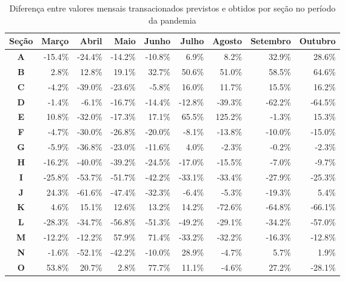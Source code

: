 \begin{table}[htb]
\centering
\caption{Diferença entre valores mensais transacionados previstos e obtidos por seção no período da pandemia}
\label{tab:pandemia:variacao-mensal-por-secao}
    \begin{tabular}{c|r|r|r|r|r|r|r|r}
        \toprule
        \textbf{Seção} & Março & Abril & Maio & Junho & Julho & Agosto & Setembro & Outubro \\
        \midrule
        \textbf{A} & -15.4\% & -24.4\% & -14.2\% & -10.8\% &   6.9\% &   8.2\% &  32.9\% &  28.6\% \\
        \textbf{B} &   2.8\% &  12.8\% &  19.1\% &  32.7\% &  50.6\% &  51.0\% &  58.5\% &  64.6\% \\
        \textbf{C} &  -4.2\% & -39.0\% & -23.6\% &  -5.8\% &  16.0\% &  11.7\% &  15.5\% &  16.2\% \\
        \textbf{D} &  -1.4\% &  -6.1\% & -16.7\% & -14.4\% & -12.8\% & -39.3\% & -62.2\% & -64.5\% \\
        \textbf{E} &  10.8\% & -32.0\% & -17.3\% &  17.1\% &  65.5\% & 125.2\% &  -1.3\% &  15.3\% \\
        \textbf{F} &  -4.7\% & -30.0\% & -26.8\% & -20.0\% &  -8.1\% & -13.8\% & -10.0\% & -15.0\% \\
        \textbf{G} &  -5.9\% & -36.8\% & -23.0\% & -11.6\% &   4.0\% &  -2.3\% &  -0.2\% &  -2.3\% \\
        \textbf{H} & -16.2\% & -40.0\% & -39.2\% & -24.5\% & -17.0\% & -15.5\% &  -7.0\% &  -9.7\% \\
        \textbf{I} & -25.8\% & -53.7\% & -51.7\% & -42.2\% & -33.1\% & -33.4\% & -27.9\% & -25.3\% \\
        \textbf{J} &  24.3\% & -61.6\% & -47.4\% & -32.3\% &  -6.4\% &  -5.3\% & -19.3\% &   5.4\% \\
        \textbf{K} &   4.6\% &  15.1\% &  12.6\% &  13.2\% &  14.2\% & -72.6\% & -64.8\% & -66.1\% \\
        \textbf{L} & -28.3\% & -34.7\% & -56.8\% & -51.3\% & -49.2\% & -29.1\% & -34.2\% & -57.0\% \\
        \textbf{M} & -12.2\% & -12.2\% &  57.9\% &  71.4\% & -33.2\% & -32.2\% & -16.3\% & -12.8\% \\
        \textbf{N} &  -1.6\% & -52.1\% & -42.2\% & -10.0\% &  28.9\% &  -4.7\% &   5.7\% &   1.9\% \\
        \textbf{O} &  53.8\% &  20.7\% &   2.8\% &  77.7\% &  11.1\% &  -4.6\% &  27.2\% & -28.1\% \\

\end{tabular}
\end{table}
